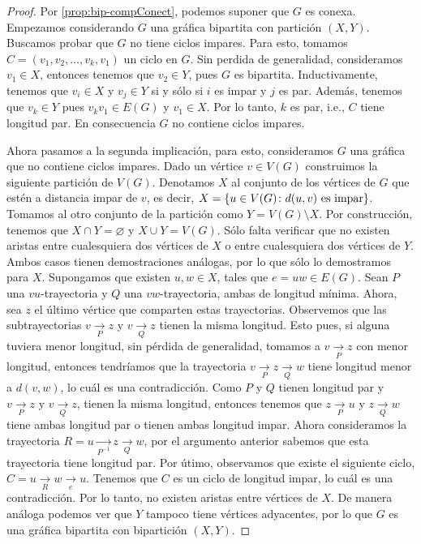 \begin{proof}
    Por \cref{prop:bip-compConect}, podemos suponer que $G$ es conexa. Empezamos
    considerando $G$ una gr\'afica bipartita con partici\'on $(X,Y)$. Buscamos
    probar que $G$ no tiene ciclos impares. Para esto, tomamos
    $C=(v_1,v_2,\dots, v_k,v_1)$ un ciclo en $G$. Sin perdida de generalidad,
    consideramos $v_1 \in X$, entonces tenemos que $v_2 \in Y$, pues $G$ es
    bipartita. Inductivamente, tenemos que $v_i \in X$ y $v_j \in Y$ si y s\'olo
    si $i$ es impar y $j$ es par. Adem\'as, tenemos que $v_k \in Y$ pues $v_k
    v_1 \in E(G)$ y $v_1 \in X$. Por lo tanto, $k$ es par, i.e., $C$ tiene
    longitud par. En consecuencia $G$ no contiene ciclos impares.

    Ahora pasamos a la segunda implicaci\'on, para esto, consideramos $G$ una
    gr\'afica que no contiene ciclos impares. Dado un v\'ertice $v \in V(G)$
    construimos la siguiente partici\'on de $V(G)$. Denotamos $X$ al conjunto de
    los v\'ertices de $G$ que est\'en a distancia impar de $v$, es decir, $X =
    \{u \in V(G) \colon d(u,v) \textnormal{ es impar}\}$. Tomamos al otro
    conjunto de la partici\'on como $Y = V(G)\setminus X$. Por construcci\'on,
    tenemos que $X \cap Y = \varnothing$ y $X \cup Y = V(G)$. S\'olo falta
    verificar que no existen aristas entre cualesquiera dos v\'ertices de $X$ o
    entre cualesquiera dos v\'ertices de $Y$. Ambos casos tienen demostraciones
    an\'alogas, por lo que s\'olo lo demostramos para $X$. Supongamos que
    existen $u,w \in X$, tales que $e=uw \in E(G)$. Sean $P$ una
    $vu$-trayectoria y $Q$ una $vw$-trayectoria, ambas de longitud m\'inima.
    Ahora, sea $z$ el \'ultimo v\'ertice que comparten estas trayectorias.
    Observemos que las subtrayectorias $v \xrightarrow[P]{}z$ y $v
    \xrightarrow[Q]{}z$ tienen la misma longitud. Esto pues, si alguna tuviera
    menor longitud, sin p\'erdida de generalidad, tomamos a $v
    \xrightarrow[P]{}z$ con menor longitud, entonces tendr\'iamos que la
    trayectoria $v \xrightarrow[P]{}z\xrightarrow[Q]{}w$ tiene longitud menor a
    $d(v,w)$, lo cu\'al es una contradicci\'on. Como $P$ y $Q$ tienen longitud
    par y $v \xrightarrow[P]{}z$ y $v \xrightarrow[Q]{}z$, tienen la misma
    longitud, entonces tenemos que $z \xrightarrow[P]{}u$ y $z
    \xrightarrow[Q]{}w$ tiene ambas longitud par o tienen ambas longitud impar.
    Ahora consideramos la trayectoria $ R= u \xrightarrow[P^{-1}]{}z
    \xrightarrow[Q]{}w$, por el argumento anterior sabemos que esta trayectoria
    tiene longitud par. Por \'utimo, observamos que existe el siguiente ciclo,
    $C=u\xrightarrow[R]{}w\xrightarrow[e]{}u$. Tenemos que $C$ es un ciclo de
    longitud impar, lo cu\'al es una contradicci\'on. Por lo tanto, no existen
    aristas entre v\'ertices de $X$. De manera an\'aloga podemos ver que $Y$
    tampoco tiene v\'ertices adyacentes, por lo que $G$ es una gr\'afica
    bipartita con bipartici\'on $(X,Y)$.
\end{proof}
    
